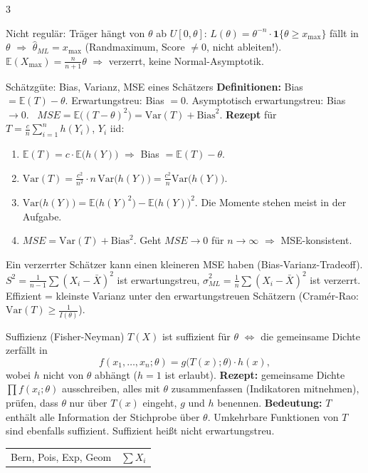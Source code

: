 \documentclass[8pt,a4paper,landscape]{extarticle}
\newcommand{\E}{\mathbb{E}}
\newcommand{\V}{\mathrm{Var}}
\newcommand{\ra}{$\Rightarrow$}
\newcommand{\ind}{\mathbf{1}}
\begin{document}
\begin{multicols*}{3}
\begin{falle}{Nicht regulär: Träger hängt von $\theta$ ab}
$U[0,\theta]$: $L(\theta)=\theta^{-n}\cdot\ind\{\theta\ge x_{\max}\}$ fällt in $\theta$ \ra{} $\hat\theta_{ML}=x_{\max}$ (Randmaximum, Score $\neq 0$, nicht ableiten!). $\E(X_{\max})=\frac{n}{n+1}\theta$ \ra{} verzerrt, keine Normal-Asymptotik.
\end{falle}
\begin{rechnen}{Schätzgüte: Bias, Varianz, MSE eines Schätzers}
\textbf{Definitionen:} Bias $=\E(T)-\theta$. Erwartungstreu: Bias $=0$. Asymptotisch erwartungstreu: Bias $\to 0$. \ $MSE=\E\big((T-\theta)^2\big)=\V(T)+\text{Bias}^2$.
\textbf{Rezept} für $T=\frac{c}{n}\sum_{i=1}^n h(Y_i)$, $Y_i$ iid:
\begin{enumerate}[leftmargin=10pt]
\item $\E(T)=c\cdot\E\big(h(Y)\big)$ \ra{} Bias $=\E(T)-\theta$.
\item $\V(T)=\frac{c^2}{n^2}\cdot n\,\V\big(h(Y)\big)=\frac{c^2}{n}\V\big(h(Y)\big)$.
\item $\V\big(h(Y)\big)=\E\big(h(Y)^2\big)-\E\big(h(Y)\big)^2$. Die Momente stehen meist in der Aufgabe.
\item $MSE=\V(T)+\text{Bias}^2$. Geht $MSE\to 0$ für $n\to\infty$ \ra{} MSE-konsistent.
\end{enumerate}
Ein verzerrter Schätzer kann einen kleineren MSE haben (Bias-Varianz-Tradeoff). $S^2=\frac{1}{n-1}\sum(X_i-\bar X)^2$ ist erwartungstreu, $\hat\sigma^2_{ML}=\frac1n\sum(X_i-\bar X)^2$ ist verzerrt. Effizient = kleinste Varianz unter den erwartungstreuen Schätzern (Cramér-Rao: $\V(T)\ge\frac{1}{I(\theta)}$).
\end{rechnen}
\begin{wissen}{Suffizienz (Fisher-Neyman)}
$T(X)$ ist suffizient für $\theta$ $\Leftrightarrow$ die gemeinsame Dichte zerfällt in
$$f(x_1,\dots,x_n;\theta)=g\big(T(x);\theta\big)\cdot h(x),$$
wobei $h$ nicht von $\theta$ abhängt ($h=1$ ist erlaubt).
\textbf{Rezept:} gemeinsame Dichte $\prod f(x_i;\theta)$ ausschreiben, alles mit $\theta$ zusammenfassen (Indikatoren mitnehmen), prüfen, dass $\theta$ nur über $T(x)$ eingeht, $g$ und $h$ benennen.
\textbf{Bedeutung:} $T$ enthält alle Information der Stichprobe über $\theta$. Umkehrbare Funktionen von $T$ sind ebenfalls suffizient. Suffizient heißt nicht erwartungstreu.
\begin{tabularx}{\linewidth}{@{}>{\raggedright\arraybackslash}X>{\raggedright\arraybackslash}p{3.3cm}@{}}
Bern, Pois, Exp, Geom & $\sum X_i$ \\

\end{tabularx}
\end{wissen}
\end{multicols*}
\end{document}
